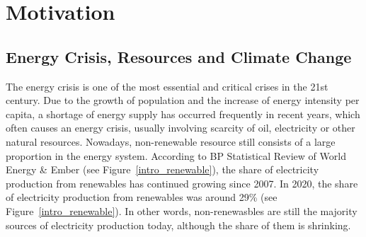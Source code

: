 
\section{Motivation}
\subsection{Energy Crisis, Resources and Climate Change}
The energy crisis is one of the most essential and critical crises in the 21st century. Due to the growth of population and the increase of energy intensity per capita, a shortage of energy supply has occurred frequently in recent years, which often causes an energy crisis, usually involving scarcity of oil, electricity or other natural resources. Nowadays, non-renewable resource still consists of a large proportion in the energy system. According to BP Statistical Review of World Energy \& Ember (see Figure~\ref{intro_renewable}), the share of electricity production from renewables has continued growing since 2007. In 2020, the share of electricity production from renewables was around 29\% (see Figure~\ref{intro_renewable}). In other words, non-renewasbles are still the majority sources of electricity production today, although the share of them is shrinking.\\


